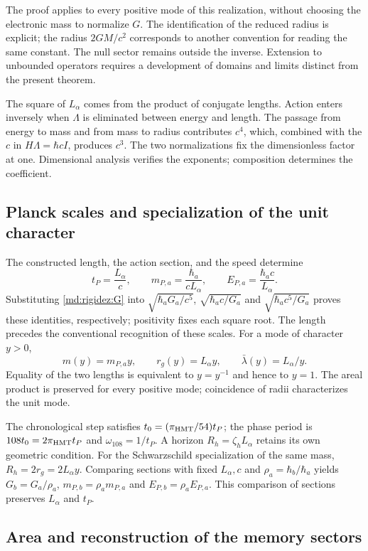 The proof applies to every positive mode of this realization, without
choosing the electronic mass to normalize $G$. The identification of
the reduced radius is explicit; the radius $2GM/c^2$ corresponds to
another convention for reading the same constant. The null sector
remains outside the inverse. Extension to unbounded operators requires
a development of domains and limits distinct from the present theorem.

The square of $L_\alpha$ comes from the product of conjugate lengths.
Action enters inversely when $\Lambda$ is eliminated between energy
and length. The passage from energy to mass and from mass to radius
contributes $c^4$, which, combined with the $c$ in $H\Lambda=\hbar cI$,
produces $c^3$. The two normalizations fix the dimensionless factor
at one. Dimensional analysis verifies the exponents; composition
determines the coefficient.

\subsection{Planck scales and specialization of the unit character}
\label{md:rigidez:escalas}

The constructed length, the action section, and the speed determine
\[
 t_P=\frac{L_\alpha}{c},\qquad
 m_{P,a}=\frac{\hbar_a}{cL_\alpha},\qquad
 E_{P,a}=\frac{\hbar_a c}{L_\alpha}.
\]
Substituting \eqref{md:rigidez:G} into
$\sqrt{\hbar_aG_a/c^5}$, $\sqrt{\hbar_ac/G_a}$ and
$\sqrt{\hbar_ac^5/G_a}$ proves these identities, respectively;
positivity fixes each square root. The length precedes the conventional
recognition of these scales.
For a mode of character $y>0$,
\[
 m(y)=m_{P,a}y,\qquad r_g(y)=L_\alpha y,\qquad
 \bar\lambda(y)=L_\alpha/y.
\]
Equality of the two lengths is equivalent to $y=y^{-1}$ and hence
to $y=1$. The areal product is preserved for every positive mode;
coincidence of radii characterizes the unit mode.

The chronological step satisfies $t_0=(\pi_{\rm HMT}/54)t_P$;
the phase period is $108t_0=2\pi_{\rm HMT}t_P$ and
$\omega_{108}=1/t_P$. A horizon $R_h=\zeta_hL_\alpha$ retains
its own geometric condition. For the Schwarzschild specialization
of the same mass, $R_h=2r_g=2L_\alpha y$.
Comparing sections with fixed $L_\alpha,c$ and
$\rho_a=\hbar_b/\hbar_a$ yields
$G_b=G_a/\rho_a$, $m_{P,b}=\rho_a m_{P,a}$ and
$E_{P,b}=\rho_a E_{P,a}$. This comparison of sections preserves
$L_\alpha$ and $t_P$.

\subsection{Area and reconstruction of the memory sectors}
\label{md:rigidez:area}

